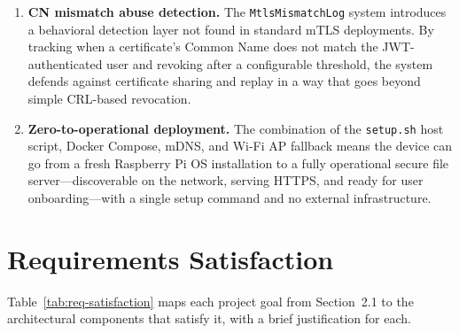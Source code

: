 \documentclass[12pt,letterpaper]{report}
\begin{document}
\begin{enumerate}
    \item \textbf{CN mismatch abuse detection.} The \texttt{MtlsMismatchLog} system introduces a behavioral detection layer not found in standard mTLS deployments. By tracking when a certificate's Common Name does not match the JWT-authenticated user and revoking after a configurable threshold, the system defends against certificate sharing and replay in a way that goes beyond simple CRL-based revocation.

    \item \textbf{Zero-to-operational deployment.} The combination of the \texttt{setup.sh} host script, Docker Compose, mDNS, and Wi-Fi AP fallback means the device can go from a fresh Raspberry Pi OS installation to a fully operational secure file server---discoverable on the network, serving HTTPS, and ready for user onboarding---with a single setup command and no external infrastructure.
\end{enumerate}

\section{Requirements Satisfaction}

Table~\ref{tab:req-satisfaction} maps each project goal from Section~2.1 to the architectural components that satisfy it, with a brief justification for each.
\end{document}
